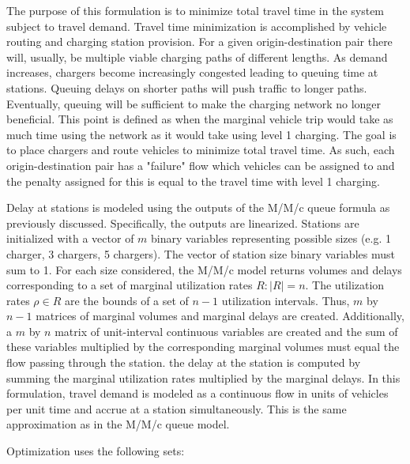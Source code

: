 The purpose of this formulation is to minimize total travel time in the system subject to travel demand. Travel time minimization is accomplished by vehicle routing and charging station provision. For a given origin-destination pair there will, usually, be multiple viable charging paths of different lengths. As demand increases, chargers become increasingly congested leading to queuing time at stations. Queuing delays on shorter paths will push traffic to longer paths. Eventually, queuing will be sufficient to make the charging network no longer beneficial. This point is defined as when the marginal vehicle trip would take as much time using the network as it would take using level 1 charging. The goal is to place chargers and route vehicles to minimize total travel time. As such, each origin-destination pair has a "failure" flow which vehicles can be assigned to and the penalty assigned for this is equal to the travel time with level 1 charging.

Delay at stations is modeled using the outputs of the M/M/c queue formula as previously discussed. Specifically, the outputs are linearized. Stations are initialized with a vector of $m$ binary variables representing possible sizes (e.g. 1 charger, 3 chargers, 5 chargers). The vector of station size binary variables must sum to 1. For each size considered, the M/M/c model returns volumes and delays corresponding to a set of marginal utilization rates $R: |R| = n$. The utilization rates $\rho \in R$ are the bounds of a set of $n - 1$ utilization intervals. Thus, $m$ by $n - 1$ matrices of marginal volumes and marginal delays are created. Additionally, a $m$ by $n$ matrix of unit-interval continuous variables are created and the sum of these variables multiplied by the corresponding marginal volumes must equal the flow passing through the station. the delay at the station is computed by summing the marginal utilization rates multiplied by the marginal delays. In this formulation, travel demand is modeled as a continuous flow in units of vehicles per unit time and accrue at a station simultaneously. This is the same approximation as in the M/M/c queue model.

Optimization uses the following sets:

